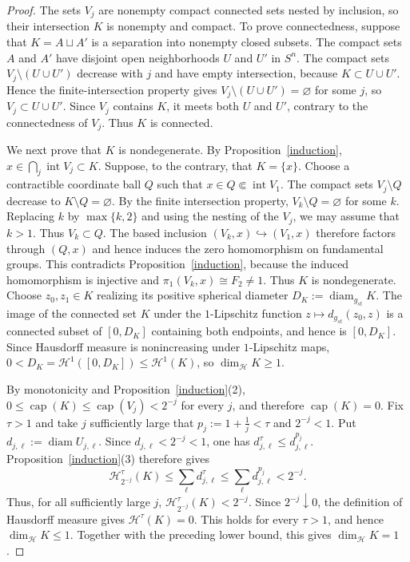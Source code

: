 \documentclass[12pt,oneside,a4paper]{article}
\theoremstyle{mytheorem}
\theoremstyle{remark}
\theoremstyle{definition}
\begin{document}
\begin{proof}
The sets $V_j$ are nonempty compact connected sets nested by inclusion,
so their intersection $K$ is nonempty and compact.  To prove
connectedness, suppose that $K=A\sqcup A'$ is a separation into nonempty
closed subsets.  The compact sets $A$ and $A'$ have disjoint open
neighborhoods $U$ and $U'$ in $S^n$.  The compact sets
$V_j\setminus(U\cup U')$ decrease with $j$ and have empty intersection, because
$K\subset U\cup U'$.  Hence the finite-intersection property gives
$V_j\setminus(U\cup U')=\varnothing$ for some $j$, so
$V_j\subset U\cup U'$.  Since $V_j$ contains $K$, it meets
both $U$ and $U'$, contrary to the connectedness of $V_j$.  Thus $K$ is
connected.

We next prove that $K$ is nondegenerate.  By
Proposition~\ref{induction}, $x\in\bigcap_j\operatorname{int}V_j\subset K$.
Suppose, to the contrary, that $K=\{x\}$.  Choose a contractible
coordinate ball $Q$ such that
$x\in Q\Subset\operatorname{int}V_1$.  The compact sets
$V_j\setminus Q$ decrease to $K\setminus Q=\varnothing$.  By the finite
intersection property, $V_k\setminus Q=\varnothing$ for some $k$.
Replacing $k$ by $\max\{k,2\}$ and using the nesting of the $V_j$, we
may assume that $k>1$.  Thus $V_k\subset Q$.  The based inclusion
$(V_k,x)\hookrightarrow(V_1,x)$ therefore factors through $(Q,x)$ and
hence induces the zero homomorphism on fundamental groups.  This
contradicts Proposition~\ref{induction}, because the induced
homomorphism is injective and $\pi_1(V_k,x)\cong F_2\neq1$.  Thus $K$
is nondegenerate.  Choose $z_0,z_1\in K$ realizing its positive
spherical diameter
$D_K:=\operatorname{diam}_{g_{st}}K$.  The image of the connected set
$K$ under the $1$-Lipschitz function
$z\mapsto d_{g_{st}}(z_0,z)$ is a connected subset of $[0,D_K]$
containing both endpoints, and hence is $[0,D_K]$.  Since Hausdorff
measure is nonincreasing under $1$-Lipschitz maps,
\(0<D_K=\mathcal{H}^1([0,D_K])\leq\mathcal{H}^1(K)\),
so $\dim_{\mathcal{H}}K\geq1$.

By monotonicity and Proposition~\ref{induction}(2),
\(0\leq\operatorname{cap}(K)\leq\operatorname{cap}(V_j)<2^{-j}\)
for every $j$, and therefore $\operatorname{cap}(K)=0$.  Fix
$\tau>1$ and take $j$ sufficiently large that
$p_j:=1+\frac1j<\tau$ and $2^{-j}<1$.  Put
$d_{j,\ell}:=\operatorname{diam}U_{j,\ell}$.  Since
$d_{j,\ell}<2^{-j}<1$, one has
$d_{j,\ell}^{\tau}\leq d_{j,\ell}^{p_j}$.  Proposition~\ref{induction}(3)
therefore gives
\[
\mathcal{H}^\tau_{2^{-j}}(K)
 \leq\sum_\ell d_{j,\ell}^{\tau}
 \leq\sum_\ell d_{j,\ell}^{p_j}
 <2^{-j}.
\]
Thus, for all sufficiently large $j$,
$\mathcal{H}^\tau_{2^{-j}}(K)<2^{-j}$.  Since $2^{-j}\downarrow0$, the
definition of Hausdorff measure gives $\mathcal{H}^\tau(K)=0$.  This holds for
every $\tau>1$, and hence $\dim_{\mathcal{H}}K\leq1$.  Together with
the preceding lower bound, this gives $\dim_{\mathcal{H}}K=1$.
\end{proof}
\end{document}
